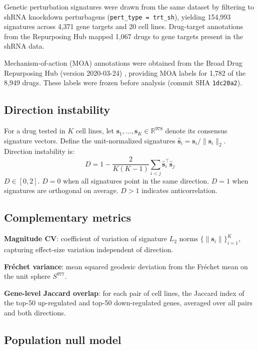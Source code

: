 \documentclass{article}
\begin{document}
Genetic perturbation signatures were drawn from the same dataset by
filtering to shRNA knockdown perturbagens (\texttt{pert\_type = trt\_sh}),
yielding 154{,}993 signatures across 4{,}371 gene targets and 20 cell lines.
Drug-target annotations from the Repurposing Hub mapped 1{,}067 drugs to
gene targets present in the shRNA data.

Mechanism-of-action (MOA) annotations were obtained from the Broad Drug
Repurposing Hub (version 2020-03-24) \citep{corsello2017drug}, providing
MOA labels for 1{,}782 of the 8{,}949 drugs. These labels were frozen
before analysis (commit SHA \texttt{1dc20a2}).

\subsection{Direction instability}

For a drug tested in $K$ cell lines, let $\mathbf{s}_1, \ldots,
\mathbf{s}_K \in \mathbb{R}^{978}$ denote its consensus signature vectors.
Define the unit-normalized signatures $\hat{\mathbf{s}}_i =
\mathbf{s}_i / \|\mathbf{s}_i\|_2$. Direction instability is:
\begin{equation}
  D = 1 - \frac{2}{K(K-1)} \sum_{i < j}
    \hat{\mathbf{s}}_i^\top \hat{\mathbf{s}}_j
  \label{eq:direction_instability}
\end{equation}
$D \in [0, 2]$. $D = 0$ when all signatures point in the same direction.
$D = 1$ when signatures are orthogonal on average. $D > 1$ indicates
anticorrelation.

\subsection{Complementary metrics}

\textbf{Magnitude CV}: coefficient of variation of signature $L_2$ norms
$\{\|\mathbf{s}_i\|\}_{i=1}^K$, capturing effect-size variation independent
of direction.

\textbf{Fr\'echet variance}: mean squared geodesic deviation from the
Fr\'echet mean on the unit sphere $S^{977}$.

\textbf{Gene-level Jaccard overlap}: for each pair of cell lines, the
Jaccard index of the top-50 up-regulated and top-50 down-regulated genes,
averaged over all pairs and both directions.

\subsection{Population null model}
\end{document}
